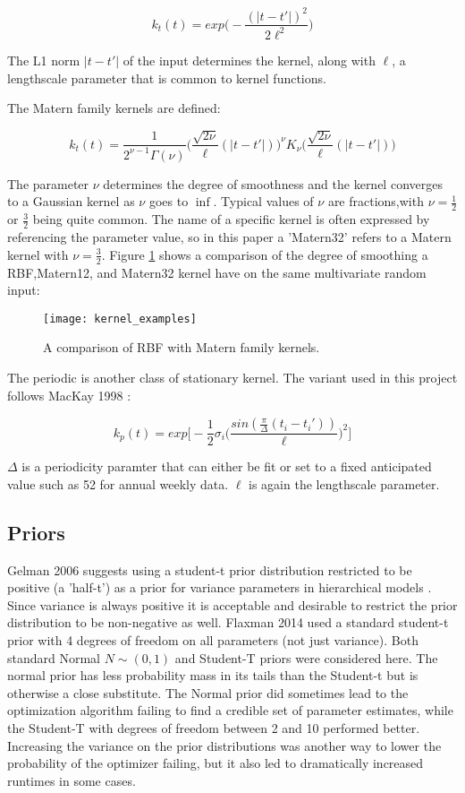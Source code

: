 $$ k_t(t) = exp\big(- \frac{(|t-t'|)^2}{2\ell^2}\big) $$

The L1 norm $|t-t'|$ of the input determines the kernel, along with $\ell$,  a lengthscale parameter that is common to kernel functions.

The Matern family kernels are defined:

$$ k_t(t) = \frac{1}{2^{\nu - 1}\Gamma(\nu)}\big(\frac{\sqrt{2\nu}}{\ell}(|t-t'|)\big)^\nu K_{\nu}\big(\frac{\sqrt{2\nu}}{\ell}(|t-t'|)\big)$$

The parameter $\nu$ determines the degree of smoothness and the kernel converges to a Gaussian kernel as $\nu$ goes to $\inf$. Typical values of $\nu$ are fractions,with $\nu=\frac{1}{2}$ or $\frac{3}{2}$ being quite common. The name of a specific kernel is often expressed by referencing the parameter value, so in this paper a 'Matern32'  refers to a Matern kernel with $\nu=\frac{3}{2}$. Figure \ref{kernel_examples} shows a comparison of the degree of smoothing a RBF,Matern12, and Matern32 kernel have on the same multivariate random input:

\begin{figure}[h!]
  \centering
  \caption{A comparison of RBF with Matern family kernels.}
  \label{kernel_examples}
  \texttt{[image: kernel\_examples]}
\end{figure}


The periodic is another class of stationary kernel. The variant used in this project follows MacKay 1998  \cite{mackay1998introduction}:

$$ k_p(t) = exp \bigg[ - \frac{1}{2}\sigma_i \big(\frac{sin(\frac{\pi}{\Delta}(t_i - t_i'))}{\ell} \big)^2 \bigg] $$

$\Delta$ is a periodicity paramter that can either be fit or set to a fixed anticipated value such as 52 for annual weekly data. $\ell$ is again the lengthscale parameter.\par


\subsection{Priors}

Gelman 2006 suggests using a student-t prior distribution restricted to be positive (a 'half-t') as a prior for variance parameters in hierarchical models \cite{gelman_2006}. Since variance is always positive it is acceptable and desirable to restrict the prior distribution to be non-negative as well. Flaxman 2014 used a standard student-t prior with 4 degrees of freedom on all parameters (not just variance). Both standard Normal $N \sim (0,1)$ and Student-T priors were considered here. The normal prior has less probability mass in its tails than the Student-t but is otherwise a close substitute. The Normal prior did sometimes lead to the optimization algorithm failing to find a credible set of parameter estimates, while the Student-T with degrees of freedom between 2 and 10 performed better. Increasing the variance on the prior distributions was another way to lower the probability of the optimizer failing, but it also led to dramatically increased runtimes in some cases.

